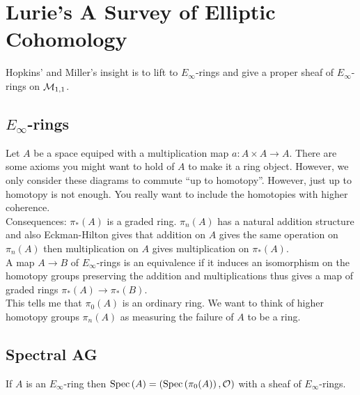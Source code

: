\documentclass[12pt]{article}
\begin{document}
\section{Lurie's A Survey of Elliptic Cohomology}

Hopkins' and Miller's insight is to lift to $E_{\infty}$-rings and give a proper sheaf of $E_{\infty}$-rings on $\mathcal{M}_{1,1}$.

\subsection{$E_\infty$-rings}

Let $A$ be a space equiped with a multiplication map $a : A \times A \to A$. There are some axioms you might want to hold of $A$ to make it a ring object. However, we only consider these diagrams to commute ``up to homotopy''. However, just up to homotopy is not enough. You really want to include the homotopies with higher coherence. 
\bigskip\\
Consequences: $\pi_*(A)$ is a graded ring. $\pi_n(A)$ has a natural addition structure and also Eckman-Hilton gives that addition on $A$ gives the same operation on $\pi_n(A)$ then multiplication on $A$ gives multiplication on $\pi_*(A)$. 
\bigskip\\
A map $A \to B$ of $E_{\infty}$-rings is an equivalence if it induces an isomorphism on the homotopy groups preserving the addition and multiplications thus gives a map of graded rings $\pi_*(A) \to \pi_*(B)$.
\bigskip\\
This tells me that $\pi_0(A)$ is an ordinary ring. We want to think of higher homotopy groups $\pi_n(A)$ as measuring the failure of $A$ to be a ring. 

\subsection{Spectral AG}

\begin{defn}
If $A$ is an $E_{\infty}$-ring then $\mathrm{Spec}\left( A \right) = (\mathrm{Spec}\left( \pi_0(A) \right), \mathcal{O}_{})$ with a sheaf of $E_{\infty}$-rings.
\end{defn}
\end{document}
